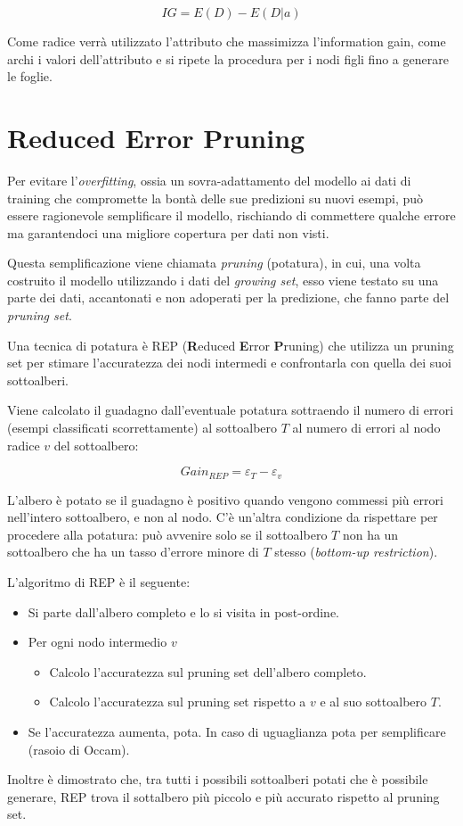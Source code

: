 $$ IG = E(D) - E(D|a) $$

Come radice verrà utilizzato l'attributo che massimizza l'information gain, come archi i valori dell'attributo e si ripete la procedura per i nodi figli fino a generare le foglie.

\section{Reduced Error Pruning}
\label{ss:rep}
Per evitare l'\textit{overfitting}, ossia un sovra-adattamento del modello ai dati di training che compromette la bontà delle sue predizioni su nuovi esempi, può essere ragionevole semplificare il modello, rischiando di commettere qualche errore ma garantendoci una migliore copertura per dati non visti.

Questa semplificazione viene chiamata \textit{pruning} (potatura), in cui, una volta costruito il modello utilizzando i dati del \textit{growing set}, esso viene testato su una parte dei dati, accantonati e non adoperati per la predizione, che fanno parte del \textit{pruning set}.

Una tecnica di potatura è REP (\textbf{R}educed \textbf{E}rror \textbf{P}runing)\cite{Quinlan:1987:SDT:50007.50008} che utilizza un pruning set per stimare l'accuratezza dei nodi intermedi e confrontarla con quella dei suoi sottoalberi.

Viene calcolato il guadagno dall'eventuale potatura sottraendo il numero di errori (esempi classificati scorrettamente) al sottoalbero $T$ al numero di errori al nodo radice $v$ del sottoalbero:

$$ Gain_{REP} = \varepsilon_T - \varepsilon_v $$

L'albero è potato se il guadagno è positivo quando vengono commessi più errori nell'intero sottoalbero, e non al nodo. C'è un'altra condizione da rispettare per procedere alla potatura: può avvenire solo se il sottoalbero $T$ non ha un sottoalbero che ha un tasso d'errore minore di $T$ stesso (\textit{bottom-up restriction}).

L'algoritmo di REP è il seguente:
\begin{itemize}
	\item Si parte dall'albero completo e lo si visita in post-ordine.
	\item Per ogni nodo intermedio $v$
	\begin{itemize}
		\item Calcolo l'accuratezza sul pruning set dell'albero completo.
		\item Calcolo l'accuratezza sul pruning set rispetto a $v$ e al suo sottoalbero $T$.
	\end{itemize}
	\item Se l'accuratezza aumenta, pota. In caso di uguaglianza pota per semplificare (rasoio di Occam).
\end{itemize}

Inoltre è dimostrato che, tra tutti i possibili sottoalberi potati che è possibile generare, REP trova il sottalbero più piccolo e più accurato rispetto al pruning set\cite{Esposito:1997:CAM:252862.252878}.